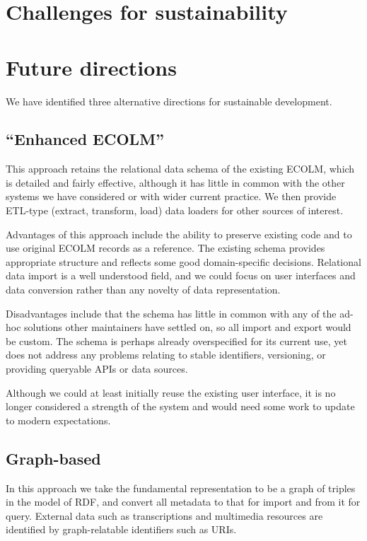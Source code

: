\documentclass[sigconf]{acmart}
\begin{document}
\begin{sloppypar}
  \section{Challenges for sustainability}\label{challenges}

  \section{Future directions}

  We have identified three alternative directions for sustainable
  development.
  
  \subsection{``Enhanced ECOLM''}

  This approach retains the relational data schema of the existing
  ECOLM, which is detailed and fairly effective, although it has
  little in common with the other systems we have considered or with
  wider current practice. We then provide ETL-type (extract,
  transform, load) data loaders for other sources of interest.

  Advantages of this approach include the ability to preserve existing
  code and to use original ECOLM records as a reference. The existing
  schema provides appropriate structure and reflects some good
  domain-specific decisions. Relational data import is a well
  understood field, and we could focus on user interfaces and data
  conversion rather than any novelty of data representation.

  Disadvantages include that the schema has little in common with any
  of the ad-hoc solutions other maintainers have settled on, so all
  import and export would be custom. The schema is perhaps already
  overspecified for its current use, yet does not address any problems
  relating to stable identifiers, versioning, or providing queryable
  APIs or data sources.

  Although we could at least initially reuse the existing user
  interface, it is no longer considered a strength of the system and
  would need some work to update to modern expectations.

  \subsection{Graph-based}

  In this approach we take the fundamental representation to be a
  graph of triples in the model of RDF, and convert all metadata to
  that for import and from it for query. External data such as
  transcriptions and multimedia resources are identified by
  graph-relatable identifiers such as URIs.


\end{sloppypar}
\end{document}
